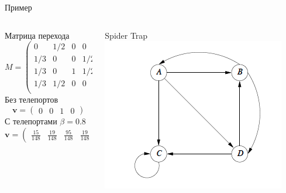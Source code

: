 \documentclass[10pt,a4paper]{beamer}
\begin{document}
\begin{frame}{Пример}

\begin{columns}[C]
	\begin{column}{.5\textwidth}
	Матрица перехода
 \[
    M = \begin{pmatrix}
    0 & 1/2 & 0 & 0 \\
    1/3 & 0 & 0 & 1/2 \\
    1/3 & 0 & 1 & 1/2 \\
    1/3 & 1/2 & 0 & 0 \\
    \end{pmatrix}
 \] 
Без телепортов
\[
\mathbf{v} = \begin{pmatrix}
0 & 0 & 1 & 0
\end{pmatrix}
\]
С телепортами $\beta = 0.8$
\[
\mathbf{v} = \begin{pmatrix}
\frac{15}{148} & \frac{19}{148} & \frac{95}{148} & \frac{19}{148}
\end{pmatrix}
\]
	\end{column}
    \begin{column}{.5\textwidth}
    \hspace{5em}Spider Trap
	\includegraphics[scale=0.45]{images/st.png}
    \end{column}    
\end{columns}

\end{frame}

\end{document}
